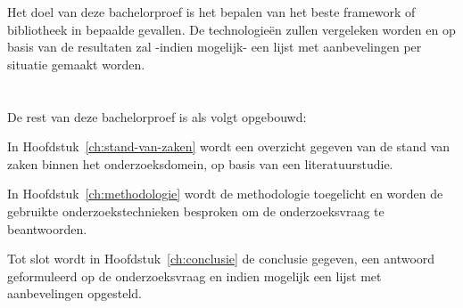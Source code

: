 Het doel van deze bachelorproef is het bepalen van het beste framework of bibliotheek in bepaalde gevallen. De technologieën zullen vergeleken worden en op basis van de resultaten zal -indien mogelijk- een lijst met aanbevelingen per situatie gemaakt worden.

\section{}
\label{sec:opzet-bachelorproef}


De rest van deze bachelorproef is als volgt opgebouwd:

In Hoofdstuk~\ref{ch:stand-van-zaken} wordt een overzicht gegeven van de stand van zaken binnen het onderzoeksdomein, op basis van een literatuurstudie.

In Hoofdstuk~\ref{ch:methodologie} wordt de methodologie toegelicht en worden de gebruikte onderzoekstechnieken besproken om de onderzoeksvraag te beantwoorden.


Tot slot wordt in Hoofdstuk~\ref{ch:conclusie} de conclusie gegeven, een antwoord geformuleerd op de onderzoeksvraag en indien mogelijk een lijst met aanbevelingen opgesteld. 